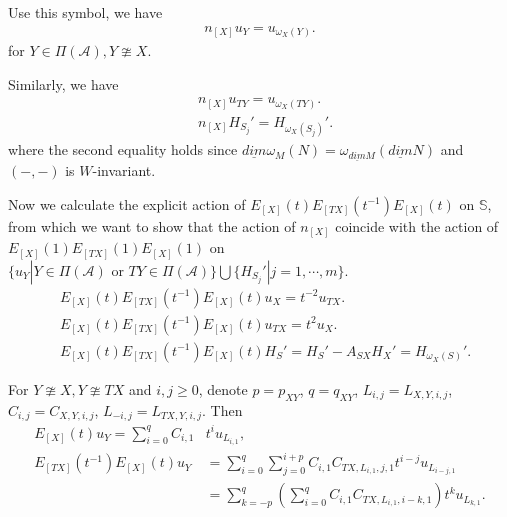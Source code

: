 \documentclass[12pt]{amsart}
\begin{document}
Use this symbol, we have 
\begin{align*}
    n_{[X]}u_Y = u_{\omega_X(Y)}.
\end{align*}
for $Y \in \Pi(\mathcal{A}), Y \ncong X$.

Similarly, we have
\begin{align*}
    &n_{[X]}u_{TY} = u_{\omega_X(TY)}. \\
    &n_{[X]} H_{S_j}' = H_{\omega_X(S_j)}'.
\end{align*}
where the second equality holds since $\underline{dim} \omega_M(N) = \omega_{\underline{dim}M}(\underline{dim}N)$ and $(-,-)$ is $W$-invariant.

Now we calculate the explicit action of $E_{[X]}(t) E_{[TX]}(t^{-1}) E_{[X]}(t)$ on $\mathbb{S}$, 
from which we want to show that the action of $n_{[X]}$ coincide with the action of $E_{[X]}(1) E_{[TX]}(1) E_{[X]}(1)$ on $\{u_Y| Y \in \Pi(\mathcal{A}) \text{ or } TY \in \Pi(\mathcal{A}) \} \bigcup \{H_{S_j}'|j=1,\cdots,m \}$. 
\begin{align*}
    &E_{[X]}(t) E_{[TX]}(t^{-1}) E_{[X]}(t) u_X = t^{-2} u_{TX} .\\
    &E_{[X]}(t) E_{[TX]}(t^{-1}) E_{[X]}(t) u_{TX} = t^2 u_X .\\
    &E_{[X]}(t) E_{[TX]}(t^{-1}) E_{[X]}(t) H_S' = H_S' -A_{SX}H_X'  = H_{\omega_X(S)}'.
\end{align*}

For $Y \ncong X,Y \ncong TX$ and $i,j \geq 0$, denote $p=p_{XY}$, $q=q_{XY}$, $L_{i,j}=L_{X,Y,i,j}$, $C_{i,j} = C_{X,Y,i,j}$, $L_{-i,j}=L_{TX,Y,i,j}$. 
Then
\begin{align*}
    E_{[X]}(t) u_Y = \sum_{i=0}^{q} C_{i,1} &t^i u_{L_{i,1}},\\
    E_{[TX]}(t^{-1}) E_{[X]}(t) u_Y &= \sum_{i=0}^{q} \sum_{j=0}^{i+p} C_{i,1} C_{TX,L_{i,1},j,1} t^{i-j} u_{L_{i-j,1}}\\
    &= \sum_{k=-p}^{q} ( \sum_{i=0}^{q} C_{i,1} C_{TX,L_{i,1},i-k,1}  ) t^k u_{L_{k,1}}.
\end{align*}
\end{document}
